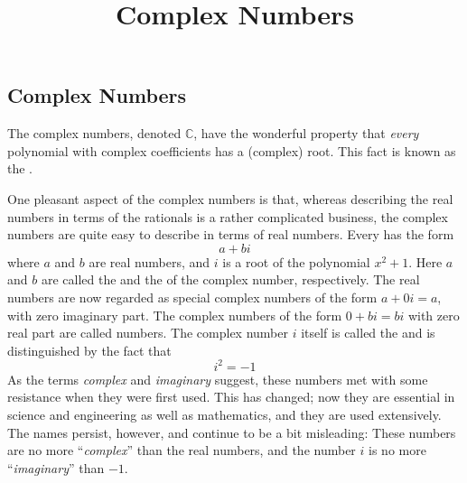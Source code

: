 \documentclass{ximera}
\title{Complex Numbers} \license{CC BY-SA-NC 4.0}
\begin{document}
\begin{abstract}
\end{abstract}
\maketitle

\begin{onlineOnly}
\section*{Complex Numbers}
\end{onlineOnly}

The complex numbers, denoted $\mathbb{C}$, have the wonderful property that \textit{every} polynomial with complex coefficients has a (complex) root. This fact is known as the .

One pleasant aspect of the complex
numbers is that, whereas describing the real numbers in terms of the
rationals is a rather complicated business, the complex numbers are
quite easy to describe in terms of real numbers. Every  has the form
\begin{equation*}
a + bi
\end{equation*}
where $a$ and $b$ are real numbers, and $i$ is a root of the polynomial $x^{2} + 1$. Here $a$ and $b$ are called the  and the  of the complex number, respectively. The real numbers are now regarded as special complex numbers of the form $a + 0i = a$, with zero imaginary part. The complex numbers of the form $0 + bi = bi$ with zero real part are called  numbers. The complex number $i$ itself is called the  and is distinguished by the fact that
\begin{equation*}
i^2 = -1
\end{equation*}
As the terms \textit{complex} and \textit{imaginary}
 suggest, these numbers met with some resistance when they were first
used. This has changed; now they are essential in science and
engineering as well as mathematics, and they are used extensively. The
names persist, however, and continue to be a bit misleading: These
numbers are no more ``\textit{complex}'' than the real numbers, and the number $i$ is no more ``\textit{imaginary}'' than $-1$.
\end{document}
